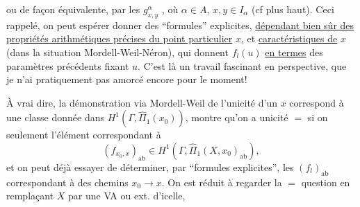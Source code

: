 ou de façon équivalente, par les $g^\alpha_{x,y}$ \inserted{$\in\widehat\pi_\alpha$}, où $\alpha\in A$, $x,y\in I_\alpha$ (cf plus haut). Ceci rappelé, on peut espérer donner des ``formules'' explicites, \uline{dépendant bien sûr des propriétés arithmétiques précises du point particulier} $x$, et \uline{caractéristiques de} $x$ (dans la situation Mordell-Weil-Néron), qui donnent $f_l(u)$ \uline{en termes} des paramètres précédents fixant $u$. C'est là un travail fascinant en perspective, que je n'ai pratiquement pas amorcé encore pour le moment!

À vrai dire, la démonstration via Mordell-Weil de l'unicité d'un $x$   correspond à une classe donnée dans $H^1(\Gamma,\widehat\Pi_1(x_0))$, montre qu'on a unicité $=$ si on   seulement l'élément correspondant à 
\[
\tag{34}(f_{x_0,x})_{\mathrm{ab}}\in H^1(\Gamma,\widehat\Pi_1(X,x_0)_{\mathrm{ab}}),
\]
et on peut déjà essayer de déterminer, par ``formules explicites'', les $(f_l)_{\mathrm{ab}}$ correspondant à des chemins $x_0\longrightarrow x$. On est réduit à regarder la $=$ question en remplaçant $X$ par une VA ou ext. d'icelle,

